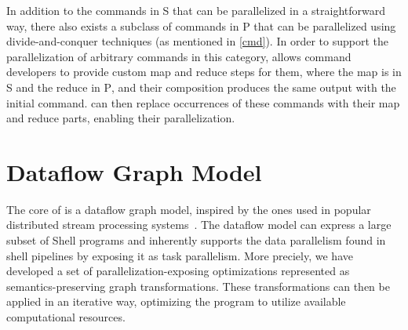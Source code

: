 \documentclass[sigplan,10pt,review,anonymous]{acmart}
\newcommand{\cn}[1]{\mbox{\textcircled{\footnotesize #1}}}
\newcommand{\pur}{\cn{\textsc{P}}\xspace}
\newcommand{\sta}{\cn{\textsc{S}}\xspace}
\newcommand{\nv}[1]{[{\color{cyan}#1 --- nv}]}
\newcommand{\kk}[1]{[{\color{magenta}#1 --- kk}]}
\newcommand{\tr}[1]{} %
\begin{document}
%
\noindent
In addition to the commands in \sta that can be parallelized in a
straightforward way, there also exists a subclass of commands in \pur
that can be parallelized using divide-and-conquer techniques (as
mentioned in \cref{cmd}). In order to support the parallelization of
arbitrary commands in this category, \sys allows command developers to
provide custom map and reduce steps for them, where the map
is in \sta and the reduce in \pur, and their composition produces the
same output with the initial command. \sys can then replace occurrences
of these commands with their map and reduce parts, enabling their
parallelization.


\tr{\kk{I am not sure a general interface is so easy to design. It needs
  more though. It might be beneficial to just talk about sort and wc
  here and how we implemented them and nothing more. Or maybe this
  could then go to the implementation? Or maybe say that one can write
  a python function that given a node of the graph, transforms it into
  many. I am not sure what is best...}}


\tr{Can we find a solution for the commands in coreutils?}


\section{Dataflow Graph Model}
\label{ir}

The core of \sys is a dataflow graph model, inspired by the ones used
in popular distributed stream processing systems~. The
dataflow model can express a large subset of Shell programs and
inherently supports the data parallelism found in shell pipelines by
exposing it as task parallelism. More preciely, we have developed a
set of parallelization-exposing optimizations represented as
semantics-preserving graph transformations. These transformations can
then be applied in an iterative way, optimizing the program to utilize
available computational resources.

\end{document}
